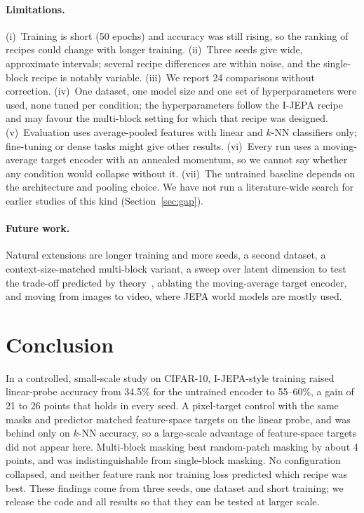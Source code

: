 \documentclass[pdflatex,sn-basic]{sn-jnl}%
\begin{document}
\paragraph{Limitations.}
(i)~Training is short (50 epochs) and accuracy was still rising, so the ranking of recipes could change with longer training. (ii)~Three seeds give wide, approximate intervals; several recipe differences are within noise, and the single-block recipe is notably variable. (iii)~We report 24 comparisons without correction. (iv)~One dataset, one model size and one set of hyperparameters were used, none tuned per condition; the hyperparameters follow the I-JEPA recipe and may favour the multi-block setting for which that recipe was designed. (v)~Evaluation uses average-pooled features with linear and $k$-NN classifiers only; fine-tuning or dense tasks might give other results. (vi)~Every run uses a moving-average target encoder with an annealed momentum, so we cannot say whether any condition would collapse without it. (vii)~The untrained baseline depends on the architecture and pooling choice. We have not run a literature-wide search for earlier studies of this kind (Section~\ref{sec:gap}).

\paragraph{Future work.}
Natural extensions are longer training and more seeds, a second dataset, a context-size-matched multi-block variant, a sweep over latent dimension to test the trade-off predicted by theory~\cite{cui2026theory}, ablating the moving-average target encoder, and moving from images to video, where JEPA world models are mostly used.

\section{Conclusion}\label{sec:conclusion}
In a controlled, small-scale study on CIFAR-10, I-JEPA-style training raised linear-probe accuracy from 34.5\% for the untrained encoder to 55--60\%, a gain of 21 to 26 points that holds in every seed. A pixel-target control with the same masks and predictor matched feature-space targets on the linear probe, and was behind only on $k$-NN accuracy, so a large-scale advantage of feature-space targets did not appear here. Multi-block masking beat random-patch masking by about 4 points, and was indistinguishable from single-block masking. No configuration collapsed, and neither feature rank nor training loss predicted which recipe was best. These findings come from three seeds, one dataset and short training; we release the code and all results so that they can be tested at larger scale.
\end{document}

